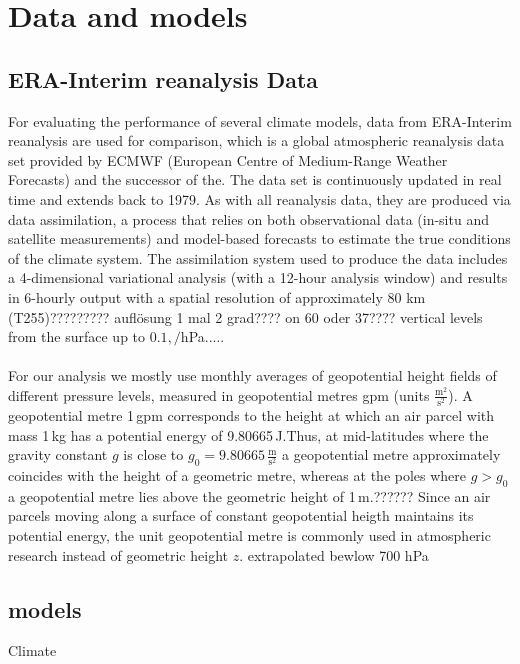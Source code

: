 \section{Data and models}
\subsection{ERA-Interim reanalysis Data}
For evaluating the performance of several climate models, data from ERA-Interim reanalysis are used for comparison, which is a global atmospheric reanalysis data set provided by  ECMWF (European  Centre  of  Medium-Range
Weather Forecasts) and the successor of the. The data set is continuously updated in real time and extends back to 1979. As with all reanalysis data, they are produced via data assimilation, a process that relies on both observational data (in-situ and satellite measurements) and model-based forecasts to estimate the true conditions of the climate system. The assimilation system used to produce the data includes a 4-dimensional variational analysis (with a 12-hour analysis window) and results in 6-hourly output with a spatial resolution of approximately 80 km (T255)????????? auflösung 1 mal 2 grad???? on 60 oder 37???? vertical levels from the surface up to $0.1,/$hPa.....\\\\
For our analysis we mostly use monthly averages of geopotential height fields of different pressure levels, measured in geopotential metres gpm (units $\frac{\mathrm{m}^2}{\mathrm{s}^2}$). A geopotential metre 1\,gpm corresponds to the height at which an air parcel with mass 1\,kg has a potential energy of 9.80665\,J.Thus, at mid-latitudes where the gravity constant $g$ is close to $g_0=9.80665\,\frac{\text{m}}{\mathrm{s}^2}$ a geopotential metre approximately coincides with the height of a geometric metre, whereas at the poles where $g>g_0$ a geopotential metre lies above the geometric height of 1\,m.?????? Since an air parcels moving  along a surface of constant geopotential heigth maintains its potential energy, the unit geopotential metre is commonly used in atmospheric research instead of geometric height $z$.
extrapolated bewlow 700 hPa
\subsection{models}
Climate
